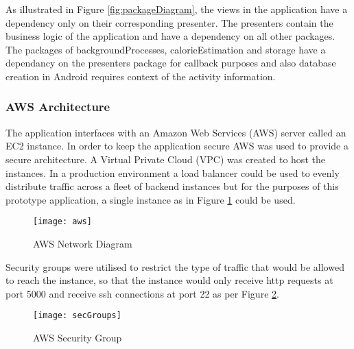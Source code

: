 As illustrated in Figure \ref{fig:packageDiagram}, the views in the application
have a dependency only on their corresponding presenter.
The presenters contain the business logic of the  application and have a dependency on all other packages.
The packages of backgroundProcesses, calorieEstimation and storage have a dependancy on the presenters package for callback purposes and also database creation in Android requires context of the activity information.

\subsubsection*{AWS Architecture}
The application interfaces with an Amazon Web Services (AWS) server called an EC2 instance.
In order to keep the application secure AWS was used to provide a secure architecture.
A Virtual Private Cloud (VPC) was created to host the instances.
In a production environment a load balancer could be used to evenly distribute traffic across a fleet of backend instances but for the purposes of this prototype application, a single instance as in Figure \ref{fig:aws} could be used. 
\begin{figure}[h]
    \centering
    \texttt{[image: aws]}
    \caption{AWS Network Diagram}
    \label{fig:aws}
\end{figure}

Security groups were utilised to restrict the type of traffic that would be allowed to reach the instance, so that the instance would only receive http requests at port 5000 and receive ssh connections at port 22 as per Figure \ref{fig:awsSecGroup}.
\begin{figure}[h]
    \centering
    \texttt{[image: secGroups]}
    \caption{AWS Security Group}
    \label{fig:awsSecGroup}
\end{figure}


